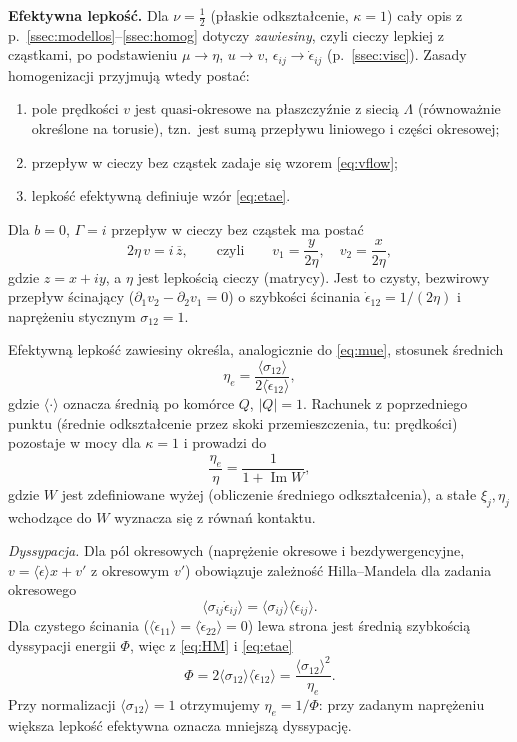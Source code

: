 \documentclass[12pt,a4paper,twoside,openright]{report}
\theoremstyle{definition}
\theoremstyle{remark}
\newcommand{\cc}[1]{\overline{#1}}
\renewcommand{\Im}{\operatorname{Im}}
\begin{document}
\textbf{Efektywna lepkość.} Dla $\nu=\tfrac12$ (płaskie odkształcenie, $\kappa=1$) cały opis z p.~\ref{ssec:modellos}--\ref{ssec:homog} dotyczy \emph{zawiesiny}, czyli cieczy lepkiej z cząstkami, po podstawieniu $\mu\to\eta$, $u\to v$, $\epsilon_{ij}\to\dot\epsilon_{ij}$ (p.~\ref{ssec:visc}). Zasady homogenizacji przyjmują wtedy postać:
\begin{enumerate}[nosep]
\item pole prędkości $v$ jest quasi-okresowe na płaszczyźnie z siecią $\Lambda$ (równoważnie określone na torusie), tzn.\ jest sumą przepływu liniowego i części okresowej;
\item przepływ w cieczy bez cząstek zadaje się wzorem \eqref{eq:vflow};
\item lepkość efektywną definiuje wzór \eqref{eq:etae}.
\end{enumerate}

Dla $b=0$, $\Gamma=i$ przepływ w cieczy bez cząstek ma postać
\begin{equation}\label{eq:vflow}
{2\eta\,v=i\,\cc z,\qquad\text{czyli}\qquad v_1=\frac{y}{2\eta},\quad v_2=\frac{x}{2\eta},}
\end{equation}
gdzie $z=x+iy$, a $\eta$ jest lepkością cieczy (matrycy). Jest to czysty, bezwirowy przepływ ścinający ($\partial_1v_2-\partial_2v_1=0$) o szybkości ścinania $\dot\epsilon_{12}=1/(2\eta)$ i naprężeniu stycznym $\sigma_{12}=1$.

Efektywną lepkość zawiesiny określa, analogicznie do \eqref{eq:mue}, stosunek średnich
\begin{equation}\label{eq:etae}
{\eta_e=\frac{\langle\sigma_{12}\rangle}{2\langle\dot\epsilon_{12}\rangle},}
\end{equation}
gdzie $\langle\cdot\rangle$ oznacza średnią po komórce $Q$, $|Q|=1$. Rachunek z poprzedniego punktu (średnie odkształcenie przez skoki przemieszczenia, tu: prędkości) pozostaje w mocy dla $\kappa=1$ i prowadzi do
\begin{equation}\label{eq:etaW}
{\frac{\eta_e}{\eta}=\frac{1}{1+\Im W},}
\end{equation}
gdzie $W$ jest zdefiniowane wyżej (obliczenie średniego odkształcenia), a stałe $\xi_j,\eta_j$ wchodzące do $W$ wyznacza się z równań kontaktu.

\emph{Dyssypacja.} Dla pól okresowych (naprężenie okresowe i bezdywergencyjne, $v=\langle\dot\epsilon\rangle x+v'$ z okresowym $v'$) obowiązuje zależność Hilla--Mandela dla zadania okresowego
\begin{equation}\label{eq:HM}
{\langle\sigma_{ij}\dot\epsilon_{ij}\rangle=\langle\sigma_{ij}\rangle\langle\dot\epsilon_{ij}\rangle.}
\end{equation}
Dla czystego ścinania ($\langle\dot\epsilon_{11}\rangle=\langle\dot\epsilon_{22}\rangle=0$) lewa strona jest średnią szybkością dyssypacji energii $\Phi$, więc z \eqref{eq:HM} i \eqref{eq:etae}
\begin{equation}\label{eq:Phi}
{\Phi=2\langle\sigma_{12}\rangle\langle\dot\epsilon_{12}\rangle=\frac{\langle\sigma_{12}\rangle^2}{\eta_e}.}
\end{equation}
Przy normalizacji $\langle\sigma_{12}\rangle=1$ otrzymujemy $\eta_e=1/\Phi$: przy zadanym naprężeniu większa lepkość efektywna oznacza mniejszą dyssypację.
\end{document}
